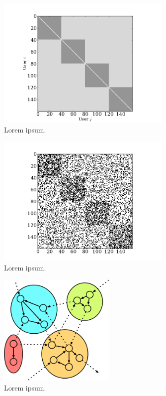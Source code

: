 \documentclass[12pt]{article}
\begin{document}
\begin{figure}[h!]
  \centering
\includegraphics[width=0.75\textwidth]{Figures/prob_mat.png}
\caption{Lorem ipsum.}
\label{Fig-SBM}
\end{figure}

\begin{figure}[h!]
  \centering
\includegraphics[width=0.75\textwidth]{Figures/adj_mat.png}
\caption{Lorem ipsum.}
\label{Fig-SBM_Realization}
\end{figure}

\begin{figure}[h!]
  \centering
\includegraphics[width=0.50\textwidth]{Figures/Communities.eps}
\caption{Lorem ipsum.}
\label{Fig-Toy_Communities}
\end{figure}
\end{document}
